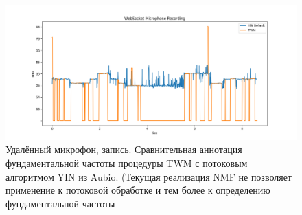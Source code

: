 \begin{figure}
  \centering
    \includegraphics[scale=.5]{res/record-twm-vs-yin.png}
  \centering
  \caption{Удалённый микрофон, запись.
    Сравнительная аннотация фундаментальной частоты процедуры
    TWM с потоковым алгоритмом YIN из Aubio.
    (Текущая реализация NMF не позволяет применение
    к потоковой обработке и тем более к определению фундаментальной
    частоты}
    \label{F:6-2-t-y-a-m}
\end{figure}
